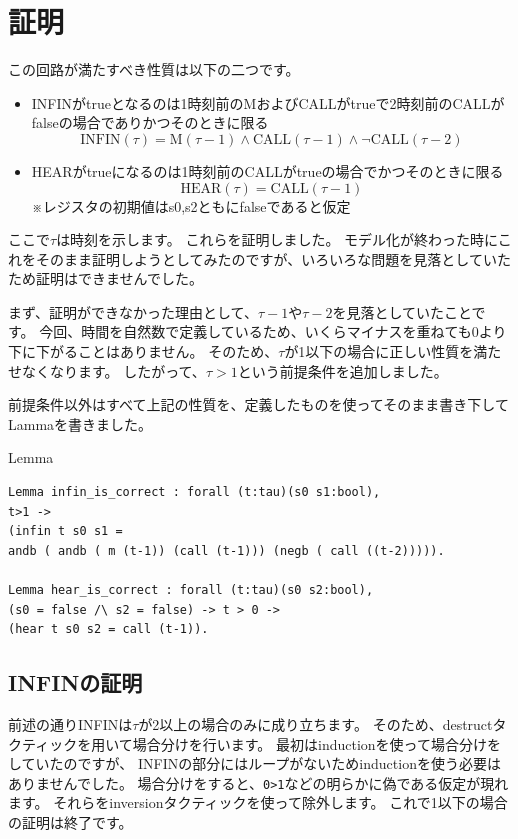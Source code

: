 \documentclass{jsbook}
\begin{document}
\section{証明}
この回路が満たすべき性質は以下の二つです。
\begin{itemize}
\item{INFINがtrueとなるのは1時刻前のMおよびCALLがtrueで2時刻前のCALLがfalseの場合でありかつそのときに限る}
$$\mbox{INFIN}(\tau)=\mbox{M}(\tau-1) \wedge \mbox{CALL}(\tau-1) \wedge \lnot \mbox{CALL}(\tau-2)$$
\item{HEARがtrueになるのは1時刻前のCALLがtrueの場合でかつそのときに限る}
$$\mbox{HEAR}(\tau) = \mbox{CALL}(\tau-1)$$
※レジスタの初期値はs0,s2ともにfalseであると仮定
\end{itemize}
ここで$\tau$は時刻を示します。
これらを証明しました。
モデル化が終わった時にこれをそのまま証明しようとしてみたのですが、いろいろな問題を見落としていたため証明はできませんでした。

まず、証明ができなかった理由として、$\tau-1$や$\tau-2$を見落としていたことです。
今回、時間を自然数で定義しているため、いくらマイナスを重ねても0より下に下がることはありません。
そのため、$\tau$が1以下の場合に正しい性質を満たせなくなります。
したがって、$\tau > 1$という前提条件を追加しました。

前提条件以外はすべて上記の性質を、定義したものを使ってそのまま書き下してLammaを書きました。

\begin{itembox}[l]{Lemma}
\begin{verbatim}
Lemma infin_is_correct : forall (t:tau)(s0 s1:bool), 
t>1 ->
(infin t s0 s1 = 
andb ( andb ( m (t-1)) (call (t-1))) (negb ( call ((t-2))))).

Lemma hear_is_correct : forall (t:tau)(s0 s2:bool),
(s0 = false /\ s2 = false) -> t > 0 ->
(hear t s0 s2 = call (t-1)).
\end{verbatim}
\end{itembox}
\subsection*{INFINの証明}
前述の通りINFINは$\tau$が2以上の場合のみに成り立ちます。
そのため、destructタクティックを用いて場合分けを行います。
最初はinductionを使って場合分けをしていたのですが、
INFINの部分にはループがないためinductionを使う必要はありませんでした。
場合分けをすると、\verb|0>1|などの明らかに偽である仮定が現れます。
それらをinversionタクティックを使って除外します。
これで1以下の場合の証明は終了です。
\end{document}
